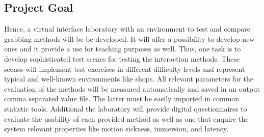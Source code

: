 \subsection{Project Goal}\label{sec:Project Goal}
Hence, a virtual interface laboratory with an environment to test and compare grabbing methods will be be developed. It will offer a possibility to develop new ones and it provide a use for teaching purposes as well. Thus, one task is to develop sophisticated test scenes for testing the interaction methods. These scenes will implement test exercises in different difficulty levels and represent typical and well-known environments like shops. All relevant parameters for the evaluation of the methods will be measured automatically and saved in an output comma separated value file. The latter must be easily imported in common statistic tools. Additional the laboratory will provide digital questionnaires to evaluate the usability of each provided method as well as one that enquire the system relevant properties like motion sickness, immersion, and latency.

\newpage



















